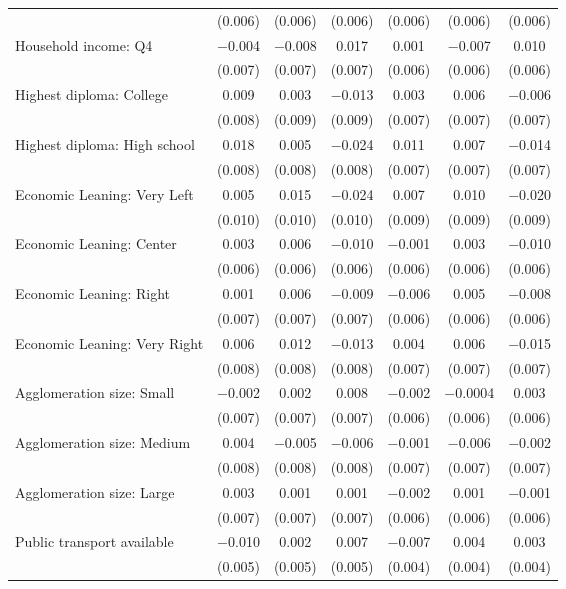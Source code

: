 \begin{tabular}{@{\extracolsep{5pt}}lcccccc}
  & (0.006) & (0.006) & (0.006) & (0.006) & (0.006) & (0.006) \\ 
  Household income: Q4 & $-$0.004 & $-$0.008 & 0.017 & 0.001 & $-$0.007 & 0.010 \\ 
  & (0.007) & (0.007) & (0.007) & (0.006) & (0.006) & (0.006) \\ 
  Highest diploma: College & 0.009 & 0.003 & $-$0.013 & 0.003 & 0.006 & $-$0.006 \\ 
  & (0.008) & (0.009) & (0.009) & (0.007) & (0.007) & (0.007) \\ 
  Highest diploma: High school & 0.018 & 0.005 & $-$0.024 & 0.011 & 0.007 & $-$0.014 \\ 
  & (0.008) & (0.008) & (0.008) & (0.007) & (0.007) & (0.007) \\ 
  Economic Leaning: Very Left & 0.005 & 0.015 & $-$0.024 & 0.007 & 0.010 & $-$0.020 \\ 
  & (0.010) & (0.010) & (0.010) & (0.009) & (0.009) & (0.009) \\ 
  Economic Leaning: Center & 0.003 & 0.006 & $-$0.010 & $-$0.001 & 0.003 & $-$0.010 \\ 
  & (0.006) & (0.006) & (0.006) & (0.006) & (0.006) & (0.006) \\ 
  Economic Leaning: Right & 0.001 & 0.006 & $-$0.009 & $-$0.006 & 0.005 & $-$0.008 \\ 
  & (0.007) & (0.007) & (0.007) & (0.006) & (0.006) & (0.006) \\ 
  Economic Leaning: Very Right & 0.006 & 0.012 & $-$0.013 & 0.004 & 0.006 & $-$0.015 \\ 
  & (0.008) & (0.008) & (0.008) & (0.007) & (0.007) & (0.007) \\ 
  Agglomeration size: Small & $-$0.002 & 0.002 & 0.008 & $-$0.002 & $-$0.0004 & 0.003 \\ 
  & (0.007) & (0.007) & (0.007) & (0.006) & (0.006) & (0.006) \\ 
  Agglomeration size: Medium & 0.004 & $-$0.005 & $-$0.006 & $-$0.001 & $-$0.006 & $-$0.002 \\ 
  & (0.008) & (0.008) & (0.008) & (0.007) & (0.007) & (0.007) \\ 
  Agglomeration size: Large & 0.003 & 0.001 & 0.001 & $-$0.002 & 0.001 & $-$0.001 \\ 
  & (0.007) & (0.007) & (0.007) & (0.006) & (0.006) & (0.006) \\ 
  Public transport available & $-$0.010 & 0.002 & 0.007 & $-$0.007 & 0.004 & 0.003 \\ 
  & (0.005) & (0.005) & (0.005) & (0.004) & (0.004) & (0.004) \\ 

\end{tabular}
